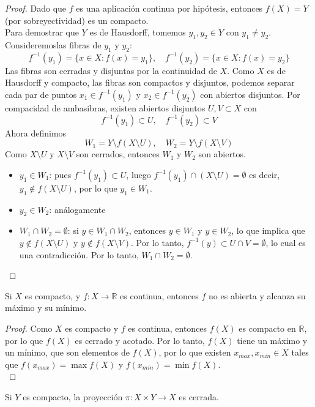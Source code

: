 \begin{proof}
    Dado que $f$ es una aplicación continua por hipótesis, entonces $f(X) = Y$ (por sobreyectividad) es un compacto. \\
    Para demostrar que $Y$ es de Hausdorff, tomemos $y_1, y_2 \in Y$ con $y_1 \neq y_2$. Consideremoslas fibras de $y_1$ y $y_2$:
    $$f^{-1}(y_1) = \{x \in X : f(x) = y_1\}, \quad f^{-1}(y_2) = \{ x \in X : f(x) = y_2\}$$
    Las fibras son cerradas y disjuntas por la continuidad de $X$. Como $X$ es de Hausdorff y compacto, las fibras son compactos y disjuntos, podemos separar cada par de puntos $x_1 \in f^{-1}(y_1)$ y $x_2 \in f^{-1}(y_2)$ con abiertos disjuntos. Por compacidad de ambasibras, existen abiertos disjuntos $U, V \subset X$ con
    $$f^{-1}(y_1) \subset U, \quad f^{-1}(y_2) \subset V$$
    Ahora definimos
    $$W_1 = Y \setminus f(X \setminus U), \quad W_2 = Y \setminus f(X \setminus V)$$
    Como $X \setminus U$ y $X \setminus V$ son cerrados, entonces $W_1$ y $W_2$ son abiertos.
    \begin{itemize}
        \item $y_1 \in W_1$: pues $f^{-1}(y_1) \subset U$, luego $f^{-1}(y_1) \cap (X \setminus U) = \emptyset$ es decir, $y_1 \notin f(X \setminus U)$, por lo que $y_1 \in W_1$.
        \item $y_2 \in W_2$: análogamente
        \item $W_1 \cap W_2 = \emptyset$: si $y \in W_1 \cap W_2$, entonces $y \in W_1$ y $y \in W_2$, lo que implica que $y \notin f(X \setminus U)$ y $y \notin f(X \setminus V)$. Por lo tanto, $f^{-1}(y) \subset U \cap V = \emptyset$, lo cual es una contradicción. Por lo tanto, $W_1 \cap W_2 = \emptyset$. 
    \end{itemize}
\end{proof}
\begin{proposición}
    Si $X$ es compacto, y $f: X \to \mathbb{R}$ es continua, entonces $f$ no es abierta y alcanza su máximo y su mínimo.
\end{proposición}
\begin{proof}
    Como $X$ es compacto y $f$ es continua, entonces $f(X)$ es compacto en $\mathbb{R}$, por lo que $f(X)$ es cerrado y acotado. Por lo tanto, $f(X)$ tiene un máximo y un mínimo, que son elementos de $f(X)$, por lo que existen $x_{max}, x_{min} \in X$ tales que $f(x_{max}) = \max f(X)$ y $f(x_{min}) = \min f(X)$. \\

\end{proof}
\begin{proposición}
    Si $Y$ es compacto, la proyección $\pi: X \times Y \to X$ es cerrada.
\end{proposición}
